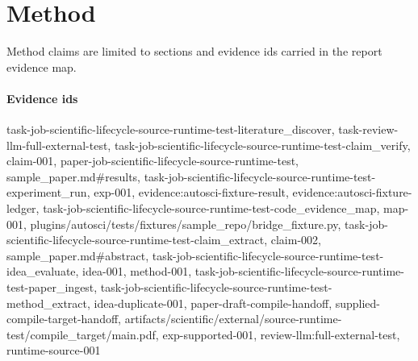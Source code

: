 \section{Method}
Method claims are limited to sections and evidence ids carried in the report evidence map.

\paragraph{Evidence ids} task-job-scientific-lifecycle-source-runtime-test-literature\_discover, task-review-llm-full-external-test, task-job-scientific-lifecycle-source-runtime-test-claim\_verify, claim-001, paper-job-scientific-lifecycle-source-runtime-test, sample\_paper.md\#results, task-job-scientific-lifecycle-source-runtime-test-experiment\_run, exp-001, evidence:autosci-fixture-result, evidence:autosci-fixture-ledger, task-job-scientific-lifecycle-source-runtime-test-code\_evidence\_map, map-001, plugins/autosci/tests/fixtures/sample\_repo/bridge\_fixture.py, task-job-scientific-lifecycle-source-runtime-test-claim\_extract, claim-002, sample\_paper.md\#abstract, task-job-scientific-lifecycle-source-runtime-test-idea\_evaluate, idea-001, method-001, task-job-scientific-lifecycle-source-runtime-test-paper\_ingest, task-job-scientific-lifecycle-source-runtime-test-method\_extract, idea-duplicate-001, paper-draft-compile-handoff, supplied-compile-target-handoff, artifacts/scientific/external/source-runtime-test/compile\_target/main.pdf, exp-supported-001, review-llm:full-external-test, runtime-source-001
